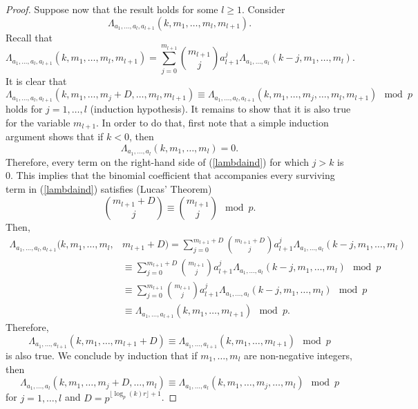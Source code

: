 \begin{proof}
Suppose now that the result holds for some $l\geq 1$.  Consider $$\Lambda_{a_1,\ldots,a_l,a_{l+1}}(k,m_1,\ldots,m_l,m_{l+1}).$$  Recall that
\begin{equation}
\label{lambdaind}
 \Lambda_{a_1,\ldots,a_l,a_{l+1}}(k,m_1,\ldots,m_l,m_{l+1}) = \sum_{j=0}^{m_{l+1}} \binom{m_{l+1}}{j}a_{l+1}^j \Lambda_{a_1,\ldots, a_l}(k-j,m_1,\ldots, m_l).
\end{equation}
It is clear that {\small$$\Lambda_{a_1,\ldots,a_l,a_{l+1}}(k,m_1,\ldots,m_j+D,\ldots,m_l,m_{l+1})\equiv \Lambda_{a_1,\ldots,a_l,a_{l+1}}(k,m_1,\ldots,m_j,\ldots,m_l,m_{l+1})\mod p$$}
holds for $j=1,\ldots, l$ (induction hypothesis).  It remains to show that it is also true for the variable $m_{l+1}$.  In order to do that, first note that a simple induction argument shows that if $k<0$, then $$\Lambda_{a_1,\ldots, a_l}(k,m_1,\ldots, m_l)=0.$$
Therefore, every term on the right-hand side of (\ref{lambdaind}) for which $j>k$ is 0.  This implies that the binomial coefficient that accompanies every surviving term in (\ref{lambdaind}) satisfies (Lucas' Theorem)
\begin{equation}
 \binom{m_{l+1}+D}{j}\equiv \binom{m_{l+1}}{j} \mod p.
\end{equation}
Then,
\begin{align}\nonumber
 \Lambda_{a_1,\ldots, a_l,a_{l+1}}(k,m_1,\ldots,m_l,&m_{l+1}+D) = \sum_{j=0}^{m_{l+1}+D}\binom{m_{l+1}+D}{j}a_{l+1}^j \Lambda_{a_1,\ldots,a_{l}}(k-j,m_1,\ldots,m_l)\\\nonumber
 &\equiv \sum_{j=0}^{m_{l+1}+D}\binom{m_{l+1}}{j}a_{l+1}^j \Lambda_{a_1,\ldots,a_{l}}(k-j,m_1,\ldots,m_l)\mod p\\\nonumber
 &\equiv \sum_{j=0}^{m_{l+1}}\binom{m_{l+1}}{j}a_{l+1}^j \Lambda_{a_1,\ldots,a_{l}}(k-j,m_1,\ldots,m_l)\mod p\\\nonumber
 &\equiv \Lambda_{a_1,\ldots,a_{l+1}}(k,m_1,\ldots,m_{l+1}) \mod p.
\end{align}
Therefore, 
$$\Lambda_{a_1,\ldots, a_{l+1}}(k,m_1,\ldots, m_{l+1}+D)\equiv \Lambda_{a_1,\ldots, a_{l+1}}(k,m_1,\ldots, m_{l+1})\mod p$$ is also true.   We conclude by induction that if $m_1,\ldots,m_l$ are 
non-negative integers,
then
$$\Lambda_{a_1,\ldots, a_l}(k,m_1,\ldots,m_j+D,\ldots,m_l)\equiv \Lambda_{a_1,\ldots, a_l}(k,m_1,\ldots,m_j,\ldots,m_l)\mod p$$
for $j=1,\ldots, l$ and $D=p^{\lfloor\log_p(k)r\rfloor+1}$.


\end{proof}

